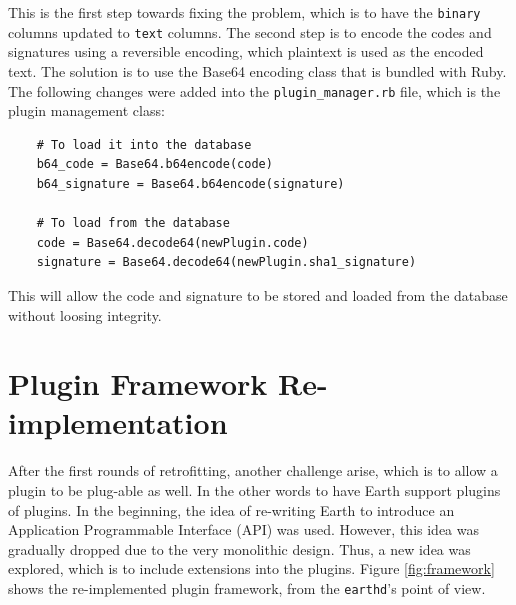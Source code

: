\documentclass{article}
\begin{document}
This is the first step towards fixing the problem, which is to have the \texttt{binary} columns updated to \texttt{text} columns. The second step is to encode the codes and signatures using a reversible encoding, which plaintext is used as the encoded text. The solution is to use the Base64 encoding class that is bundled with Ruby. The following changes were added into the \texttt{plugin\_manager.rb} file, which is the plugin management class:

\begin{verbatim}
    # To load it into the database
    b64_code = Base64.b64encode(code)
    b64_signature = Base64.b64encode(signature)
    
    # To load from the database
    code = Base64.decode64(newPlugin.code)
    signature = Base64.decode64(newPlugin.sha1_signature)
\end{verbatim}

This will allow the code and signature to be stored and loaded from the database without loosing integrity. 


\section{Plugin Framework Re-implementation} %
\label{sec:plugin_framework_re-implementation}

After the first rounds of retrofitting, another challenge arise, which is to allow a plugin to be plug-able as well. In the other words to have Earth support plugins of plugins. In the beginning, the idea of re-writing Earth to introduce an Application Programmable Interface (API) was used. However, this idea was gradually dropped due to the very monolithic design. Thus, a new idea was explored, which is to include extensions into the plugins. Figure \ref{fig:framework} shows the re-implemented plugin framework, from the \texttt{earthd}'s point of view. 
\end{document}
